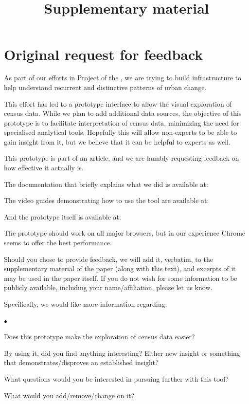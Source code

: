\documentclass[a4paper]{article}
\title{Supplementary material}
\author{}
\date{}
\newcommand{\squishlist}{
 \begin{list}{$\bullet$}
  { \setlength{\itemsep}{0pt}
     \setlength{\parsep}{3pt}
     \setlength{\topsep}{3pt}
     \setlength{\partopsep}{0pt}
     \setlength{\leftmargin}{1.5em}
     \setlength{\labelwidth}{1em}
     \setlength{\labelsep}{0.5em} } }
\newcommand{\squishend}{
  \end{list}  }
\newcommand{\censure}[1]{}
\begin{document}
\maketitle


\section{Original request for feedback}
As part of our efforts in \censure{the Urban Genome} Project of the
\censure{University of Toronto}, we are trying to build infrastructure to help
understand recurrent and distinctive patterns of urban change.

This effort has led to a prototype interface to allow the visual exploration of
census data. While we plan to add additional data sources, the objective of this
prototype is to facilitate interpretation of census data, minimizing the need
for specialised analytical tools. Hopefully this will allow non-experts to be
able to gain insight from it, but we believe that it can be helpful to experts
as well.  

This prototype is part of an article, and we are humbly requesting feedback on
how effective it actually is.

The documentation that briefly explains what we did is available at:

\censure{\href{http://ug.daniels.utoronto.ca/~diasf/CTEvo/doc.html}{\url{http://ug.daniels.utoronto.ca/~diasf/CTEvo/doc.html}}}

The video guides demonstrating how to use the tool are available at:

\censure{\href{https://www.youtube.com/watch?v=OZFUA0ThEaY&list=PLBd6KRI4PG-RcxAX35OfHd1DKl3qWfXRV}{youtube}}

And the prototype itself is available at:

\censure{\href{http://ug.daniels.utoronto.ca/~diasf/CTEvo/}{\url{http://ug.daniels.utoronto.ca/~diasf/CTEvo/}}}

The prototype should work on all major browsers, but in our experience Chrome
seems to offer the best performance.

Should you chose to provide feedback, we will add it, verbatim, to the
supplementary material of the paper (along with this text), and excerpts of it
may be used in the paper itself. If you do not wish for some information to be
publicly available, including your name/affiliation, please let us know.

Specifically, we would like more information regarding:
\squishlist
    \item{Does this prototype make the exploration of census data easier?}
    \item{By using it, did you find anything interesting? Either new insight or something that demonstrates/disproves an established insight? }
    \item{What questions would you be interested in pursuing further with this tool? }
    \item{What would you add/remove/change on it?}
\squishend
\end{document}
